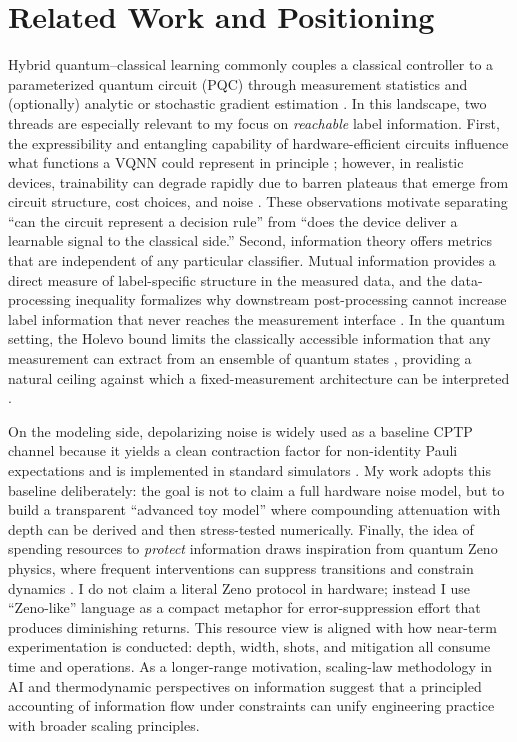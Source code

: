 \documentclass[journal]{IEEEtran}
\begin{document}
\section{Related Work and Positioning}
Hybrid quantum--classical learning commonly couples a classical controller to a parameterized quantum circuit (PQC) through measurement statistics and (optionally) analytic or stochastic gradient estimation \cite{ref15,ref16}. In this landscape, two threads are especially relevant to my focus on \emph{reachable} label information. First, the expressibility and entangling capability of hardware-efficient circuits influence what functions a VQNN could represent in principle \cite{ref7}; however, in realistic devices, trainability can degrade rapidly due to barren plateaus that emerge from circuit structure, cost choices, and noise \cite{ref4,ref5,ref6}. These observations motivate separating ``can the circuit represent a decision rule'' from ``does the device deliver a learnable signal to the classical side.'' Second, information theory offers metrics that are independent of any particular classifier. Mutual information provides a direct measure of label-specific structure in the measured data, and the data-processing inequality formalizes why downstream post-processing cannot increase label information that never reaches the measurement interface \cite{ref3}. In the quantum setting, the Holevo bound limits the classically accessible information that any measurement can extract from an ensemble of quantum states \cite{ref2}, providing a natural ceiling against which a fixed-measurement architecture can be interpreted \cite{ref1}. 

On the modeling side, depolarizing noise is widely used as a baseline CPTP channel because it yields a clean contraction factor for non-identity Pauli expectations and is implemented in standard simulators \cite{ref8,ref9}. My work adopts this baseline deliberately: the goal is not to claim a full hardware noise model, but to build a transparent ``advanced toy model'' where compounding attenuation with depth can be derived and then stress-tested numerically. Finally, the idea of spending resources to \emph{protect} information draws inspiration from quantum Zeno physics, where frequent interventions can suppress transitions and constrain dynamics \cite{ref17,ref18}. I do not claim a literal Zeno protocol in hardware; instead I use ``Zeno-like'' language as a compact metaphor for error-suppression effort that produces diminishing returns. This resource view is aligned with how near-term experimentation is conducted: depth, width, shots, and mitigation all consume time and operations. As a longer-range motivation, scaling-law methodology in AI \cite{ref10,ref11} and thermodynamic perspectives on information \cite{ref12,ref13,ref14} suggest that a principled accounting of information flow under constraints can unify engineering practice with broader scaling principles.
\end{document}
